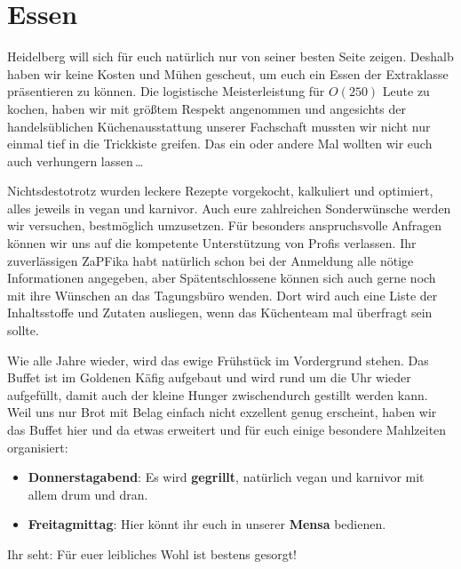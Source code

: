 
\section{Essen}
Heidelberg will sich für euch natürlich nur von seiner besten Seite zeigen. Deshalb haben wir keine Kosten und Mühen gescheut,  um euch ein Essen der Extraklasse präsentieren zu können. Die logistische Meisterleistung für $O(250)$ Leute zu kochen, haben wir mit größtem Respekt angenommen und angesichts der handelsüblichen Küchenausstattung unserer Fachschaft mussten wir nicht nur einmal tief in die Trickkiste greifen. Das ein oder andere Mal wollten wir euch auch verhungern lassen\,\dots

Nichtsdestotrotz wurden leckere Rezepte vorgekocht, kalkuliert und optimiert, alles jeweils in vegan und karnivor.  Auch eure zahlreichen Sonderwünsche werden wir versuchen, bestmöglich umzusetzen. Für besonders anspruchsvolle Anfragen können wir uns auf die kompetente Unterstützung von Profis verlassen. Ihr zuverlässigen ZaPFika habt natürlich schon bei der Anmeldung alle nötige Informationen angegeben, aber Spätentschlossene können sich auch gerne noch mit ihre Wünschen an das Tagungsbüro wenden. Dort wird auch eine Liste der Inhaltsstoffe und Zutaten ausliegen, wenn das Küchenteam mal überfragt sein sollte.

Wie alle Jahre wieder, wird das ewige Frühstück im Vordergrund stehen. Das Buffet ist im Goldenen Käfig aufgebaut und wird rund um die Uhr wieder aufgefüllt, damit auch der kleine Hunger zwischendurch gestillt werden kann. Weil uns nur Brot mit Belag einfach nicht exzellent genug erscheint, haben wir das Buffet hier und da etwas erweitert und für euch einige besondere Mahlzeiten organisiert:
  \begin{itemize}    
    \item \textbf{Donnerstagabend}: Es wird \textbf{gegrillt}, natürlich vegan und karnivor mit allem drum und dran.
    \item \textbf{Freitagmittag}: Hier könnt ihr euch in unserer \textbf{Mensa} bedienen.
  \end{itemize}
  Ihr seht: Für euer leibliches Wohl ist bestens gesorgt! \\

